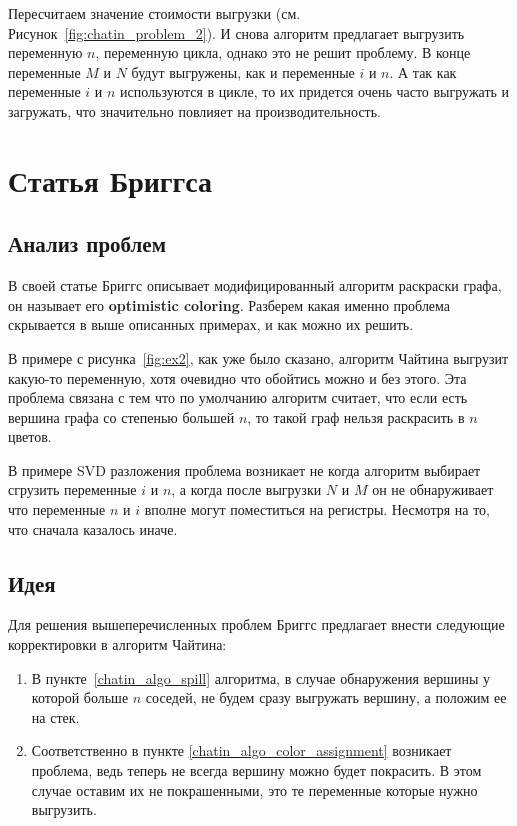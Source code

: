 Пересчитаем значение стоимости выгрузки (см. Рисунок~\ref{fig:chatin_problem_2}). И снова алгоритм предлагает
выгрузить переменную $n$, переменную цикла, однако это не решит проблему.
В конце переменные $M$ и $N$ будут выгружены, как и переменные $i$ и $n$.
А так как переменные $i$ и $n$ используются в цикле, то их придется очень часто выгружать и загружать, что
значительно повлияет на производительность.

\section{Статья Бриггса}

\subsection{Анализ проблем}

В своей статье Бриггс описывает модифицированный алгоритм раскраски графа, он называет его \textbf{optimistic coloring}.
Разберем какая именно проблема скрывается в выше описанных примерах, и как можно их решить.

В примере с рисунка~\ref{fig:ex2}, как уже было сказано, алгоритм Чайтина выгрузит какую-то переменную,
хотя очевидно что обойтись можно и без этого. Эта проблема связана с тем что по умолчанию алгоритм считает,
что если есть вершина графа со степенью большей $n$, то такой граф нельзя раскрасить в $n$ цветов.

В примере SVD разложения проблема возникает не когда алгоритм выбирает сгрузить переменные $i$ и $n$, а когда
после выгрузки $N$ и $M$ он не обнаруживает что переменные $n$ и $i$ вполне могут поместиться на регистры.
Несмотря на то, что сначала казалось иначе.

\subsection{Идея}

Для решения вышеперечисленных проблем Бриггс предлагает внести следующие корректировки в алгоритм Чайтина:

\begin{enumerate}
    \item В пункте~\ref{chatin_algo_spill} алгоритма, в случае обнаружения вершины у которой больше $n$ соседей,
    не будем сразу выгружать вершину, а положим ее на стек. \label{briggs_change_spill}
    \item Соответственно в пункте \ref{chatin_algo_color_assignment} возникает проблема, ведь теперь не всегда
    вершину можно будет покрасить. В этом случае оставим их не покрашенными, это те переменные которые нужно
    выгрузить.
    
\end{enumerate}

